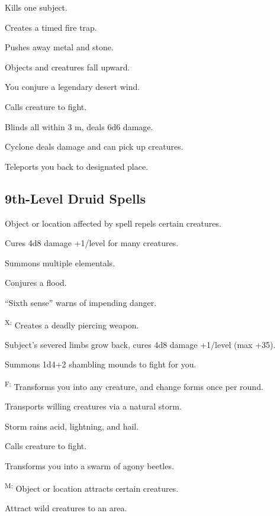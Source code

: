  Kills one subject.

 Creates a timed fire trap.

 Pushes away metal and stone.

 Objects and creatures fall upward.

 You conjure a legendary desert wind.

 Calls creature to fight.

 Blinds all within 3 m, deals 6d6 damage.

 Cyclone deals damage and can pick up creatures.

 Teleports you back to designated place.



\subsection{9th-Level Druid Spells}

 Object or location affected by spell repels certain creatures.

 Cures 4d8 damage +1/level for many creatures.

 Summons multiple elementals.

 Conjures a flood.

 ``Sixth sense'' warns of impending danger.

\textsuperscript{X:} Creates a deadly piercing weapon.

 Subject's severed limbs grow back, cures 4d8 damage +1/level (max +35).

 Summons 1d4+2 shambling mounds to fight for you.

\textsuperscript{F:} Transforms you into any creature, and change forms once per round.

 Transports willing creatures via a natural storm.

 Storm rains acid, lightning, and hail.

 Calls creature to fight.

 Transforms you into a swarm of agony beetles.

\textsuperscript{M:} Object or location attracts certain creatures.

 Attract wild creatures to an area.